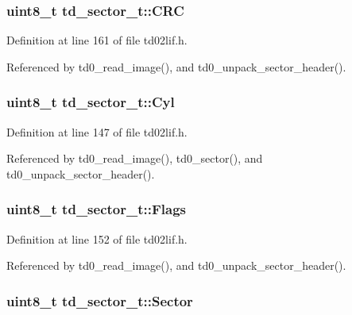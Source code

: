 \subsubsection[{\texorpdfstring{C\+RC}{CRC}}]{\setlength{\rightskip}{0pt plus 5cm}uint8\+\_\+t td\+\_\+sector\+\_\+t\+::\+C\+RC}\hypertarget{structtd__sector__t_aaccfa1ee85151410b042457fc5b584e5}{}\label{structtd__sector__t_aaccfa1ee85151410b042457fc5b584e5}


Definition at line 161 of file td02lif.\+h.



Referenced by td0\+\_\+read\+\_\+image(), and td0\+\_\+unpack\+\_\+sector\+\_\+header().

\subsubsection[{\texorpdfstring{Cyl}{Cyl}}]{\setlength{\rightskip}{0pt plus 5cm}uint8\+\_\+t td\+\_\+sector\+\_\+t\+::\+Cyl}\hypertarget{structtd__sector__t_afddd9f1e3a41cc6e3a9be2478cd3305b}{}\label{structtd__sector__t_afddd9f1e3a41cc6e3a9be2478cd3305b}


Definition at line 147 of file td02lif.\+h.



Referenced by td0\+\_\+read\+\_\+image(), td0\+\_\+sector(), and td0\+\_\+unpack\+\_\+sector\+\_\+header().

\subsubsection[{\texorpdfstring{Flags}{Flags}}]{\setlength{\rightskip}{0pt plus 5cm}uint8\+\_\+t td\+\_\+sector\+\_\+t\+::\+Flags}\hypertarget{structtd__sector__t_ad30cfc0c6589ff25f8456ada5b352efa}{}\label{structtd__sector__t_ad30cfc0c6589ff25f8456ada5b352efa}


Definition at line 152 of file td02lif.\+h.



Referenced by td0\+\_\+read\+\_\+image(), and td0\+\_\+unpack\+\_\+sector\+\_\+header().

\subsubsection[{\texorpdfstring{Sector}{Sector}}]{\setlength{\rightskip}{0pt plus 5cm}uint8\+\_\+t td\+\_\+sector\+\_\+t\+::\+Sector}\hypertarget{structtd__sector__t_a703252220f745cd6adfedadd5cc993d6}{}\label{structtd__sector__t_a703252220f745cd6adfedadd5cc993d6}


